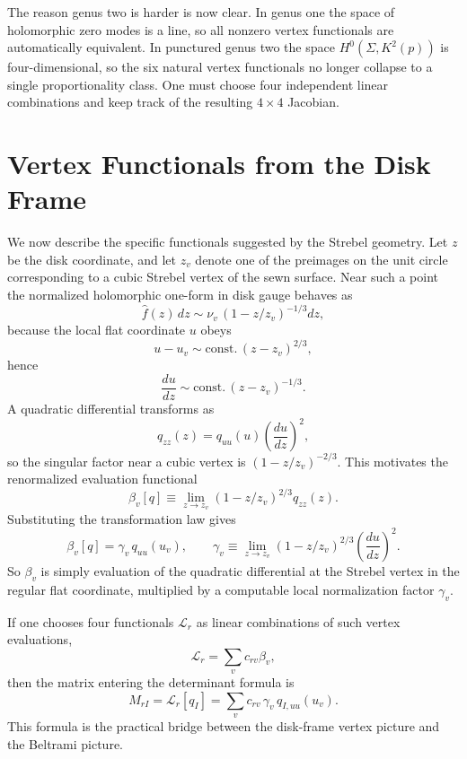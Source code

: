 \documentclass[12pt]{article}
\newcommand{\cL}{\mathcal{L}}
\begin{document}
The reason genus two is harder is now clear. In genus one the space of holomorphic zero modes is a line, so all nonzero vertex functionals are automatically equivalent. In punctured genus two the space $H^0(\Sigma,K^2(p))$ is four-dimensional, so the six natural vertex functionals no longer collapse to a single proportionality class. One must choose four independent linear combinations and keep track of the resulting $4\times 4$ Jacobian.

\section{Vertex Functionals from the Disk Frame}

We now describe the specific functionals suggested by the Strebel geometry. Let $z$ be the disk coordinate, and let $z_v$ denote one of the preimages on the unit circle corresponding to a cubic Strebel vertex of the sewn surface. Near such a point the normalized holomorphic one-form in disk gauge behaves as
\begin{equation}
\widehat f(z)\,dz \sim \nu_v\,(1-z/z_v)^{-1/3}dz,
\end{equation}
because the local flat coordinate $u$ obeys
\begin{equation}
u-u_v \sim \text{const.}\,(z-z_v)^{2/3},
\end{equation}
hence
\begin{equation}
\frac{du}{dz}\sim \text{const.}\,(z-z_v)^{-1/3}.
\end{equation}
A quadratic differential transforms as
\begin{equation}
q_{zz}(z) = q_{uu}(u)\left(\frac{du}{dz}\right)^2,
\end{equation}
so the singular factor near a cubic vertex is $(1-z/z_v)^{-2/3}$. This motivates the renormalized evaluation functional
\begin{equation}
\beta_v[q] \equiv \lim_{z\to z_v}(1-z/z_v)^{2/3}q_{zz}(z).
\label{eq:betadef}
\end{equation}
Substituting the transformation law gives
\begin{equation}
\beta_v[q] = \gamma_v\,q_{uu}(u_v),
\qquad
\gamma_v \equiv \lim_{z\to z_v}(1-z/z_v)^{2/3}\left(\frac{du}{dz}\right)^2.
\label{eq:betaflat}
\end{equation}
So $\beta_v$ is simply evaluation of the quadratic differential at the Strebel vertex in the regular flat coordinate, multiplied by a computable local normalization factor $\gamma_v$.

If one chooses four functionals $\cL_r$ as linear combinations of such vertex evaluations,
\begin{equation}
\cL_r = \sum_v c_{rv}\beta_v,
\label{eq:Llinearcomb}
\end{equation}
then the matrix entering the determinant formula is
\begin{equation}
M_{rI} = \cL_r[q_I] = \sum_v c_{rv}\,\gamma_v\,q_{I,uu}(u_v).
\label{eq:matrixvertex}
\end{equation}
This formula is the practical bridge between the disk-frame vertex picture and the Beltrami picture.
\end{document}
